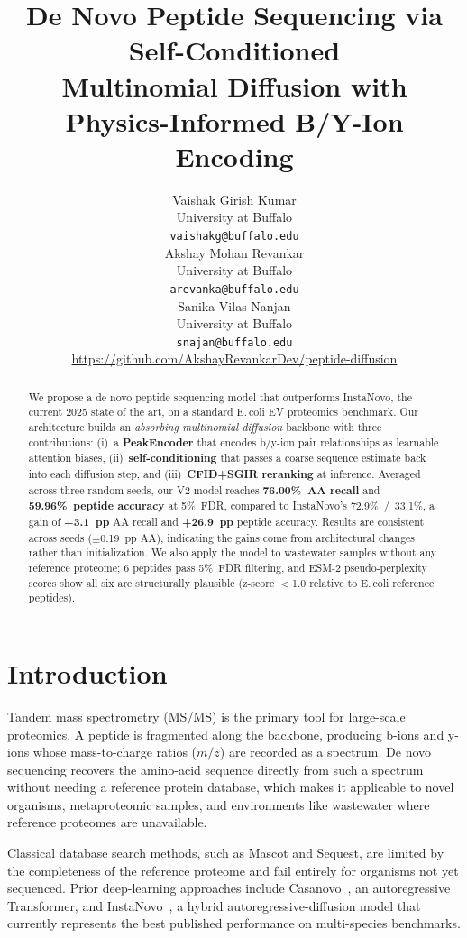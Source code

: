 \documentclass{article}
\title{De Novo Peptide Sequencing via Self-Conditioned\\
  Multinomial Diffusion with Physics-Informed B/Y-Ion Encoding}
\author{%
  Vaishak Girish Kumar \\
  University at Buffalo \\
  \texttt{vaishakg@buffalo.edu} \\
  \And
  Akshay Mohan Revankar \\
  University at Buffalo \\
  \texttt{arevanka@buffalo.edu} \\
  \And
  Sanika Vilas Nanjan \\
  University at Buffalo \\
  \texttt{snajan@buffalo.edu} \\
  \AND
  \url{https://github.com/AkshayRevankarDev/peptide-diffusion}
}
\begin{document}
\maketitle

\begin{abstract}
\noindent
We propose a de novo peptide sequencing model that outperforms InstaNovo, the current 2025 state of the art, on a standard E.\,coli EV proteomics benchmark.
Our architecture builds an \textit{absorbing multinomial diffusion} backbone with three contributions: (i)~a \textbf{PeakEncoder} that encodes b/y-ion pair relationships as learnable attention biases,
(ii)~\textbf{self-conditioning} that passes a coarse sequence estimate back into each diffusion step,
and (iii)~\textbf{CFID+SGIR reranking} at inference.
Averaged across three random seeds, our V2 model reaches
\textbf{76.00\%~AA recall} and \textbf{59.96\%~peptide accuracy} at 5\%~FDR,
compared to InstaNovo's 72.9\%~/~33.1\%,
a gain of \textbf{+3.1~pp} AA recall and \textbf{+26.9~pp} peptide accuracy.
Results are consistent across seeds ($\pm$0.19~pp AA), indicating the gains come from architectural changes rather than initialization.
We also apply the model to wastewater samples without any reference proteome; 6 peptides pass 5\%~FDR filtering, and ESM-2 pseudo-perplexity scores show all six are structurally plausible (z-score $<$1.0 relative to E.\,coli reference peptides).
\end{abstract}

\section{Introduction}

Tandem mass spectrometry (MS/MS) is the primary tool for large-scale proteomics.
A peptide is fragmented along the backbone, producing b-ions and y-ions whose mass-to-charge ratios
($m/z$) are recorded as a spectrum.
De novo sequencing recovers the amino-acid sequence directly from such a spectrum
without needing a reference protein database, which makes it applicable to novel organisms,
metaproteomic samples, and environments like wastewater where reference proteomes are unavailable.

Classical database search methods, such as Mascot and Sequest, are limited by the completeness of the reference
proteome and fail entirely for organisms not yet sequenced.
Prior deep-learning approaches include Casanovo~\citep{casanovo2023}, an autoregressive Transformer,
and InstaNovo~\citep{instanovo2024}, a hybrid autoregressive-diffusion model that currently represents
the best published performance on multi-species benchmarks.
\end{document}
